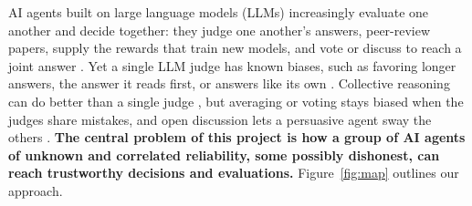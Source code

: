 \documentclass[12pt,letterpaper]{article}
\begin{document}
AI agents built on large language models (LLMs) increasingly evaluate one another and decide together: they judge one another's answers, peer-review papers, supply the rewards that train new models, and vote or discuss to reach a joint answer \citep{zheng2023judging,luo2025llm4sr,lee2024rlaif,du2024debate}. Yet a single LLM judge has known biases, such as favoring longer answers, the answer it reads first, or answers like its own \citep{zheng2023judging,wang2024fair,panickssery2024self}. Collective reasoning can do better than a single judge \citep{verga2024juries,du2024debate}, but averaging or voting stays biased when the judges share mistakes, and open discussion lets a persuasive agent sway the others \citep{amayuelas2024attack}. \textbf{The central problem of this project is how a group of AI agents of unknown and correlated reliability, some possibly dishonest, can reach trustworthy decisions and evaluations.} Figure~\ref{fig:map} outlines our approach.
\end{document}
